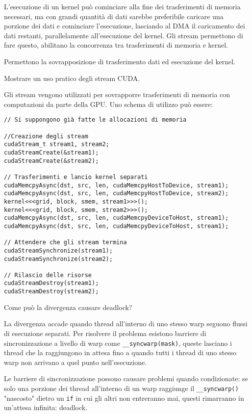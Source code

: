 \begin{questions}
\begin{solution}
        L'esecuzione di un kernel può cominciare alla fine dei trasferimenti di memoria necessari, ma con grandi quantità di dati sarebbe preferibile caricare una porzione dei dati e cominciare l'esecuzione, lasciando al DMA il caricamento dei dati restanti, parallelamente all'esecuzione del kernel. Gli stream permettono di fare questo, abilitano la concorrenza tra trasferimenti di memoria e kernel.
        
        Permettono la sovrapposizione di trasferimento dati ed esecuzione del kernel.
    \end{solution}
    
    \question Mostrare un uso pratico degli stream CUDA.
    
    \begin{solution}
        Gli stream vengono utilizzati per sovrapporre trasferimenti di memoria con computazioni da parte della GPU. Uno schema di utilizzo può essere: 
        \begin{verbatim}
// Si suppongono già fatte le allocazioni di memoria

//Creazione degli stream
cudaStream_t stream1, stream2;
cudaStreamCreate(&stream1);
cudaStreamCreate(&stream2);

// Trasferimenti e lancio kernel separati
cudaMemcpyAsync(dst, src, len, cudaMemcpyHostToDevice, stream1);
cudaMemcpyAsync(dst, src, len, cudaMemcpyHostToDevice, stream2);
kernel<<<grid, block, smem, stream1>>>();
kernel<<<grid, block, smem, stream2>>>();
cudaMemcpyAsync(dst, src, len, cudaMemcpyDeviceToHost, stream1);
cudaMemcpyAsync(dst, src, len, cudaMemcpyDeviceToHost, stream1);

// Attendere che gli stream termina
cudaStreamSynchronize(stream1);
cudaStreamSynchronize(stream2);

// Rilascio delle risorse
cudaStreamDestroy(stream1);
cudaStreamDestroy(stream2);
        \end{verbatim}
    \end{solution}
    
    \question Come può la divergenza causare deadlock?
    
    \begin{solution}
        La divergenza accade quando thread all'interno di uno stesso warp seguono flussi di esecuzione separati. Per risolvere il problema esistono barriere di sincronizzazione a livello di warp come \texttt{\_\_syncwarp(mask)}, queste lasciano i thread che la raggiungono in attesa fino a quando tutti i thread di uno stesso warp non arrivano a quel punto nell'esecuzione.
        
        Le barriere di sincronizzazione possono causare problemi quando condizionate: se solo una porzione dei thread all'interno di un warp raggiunge il \texttt{\_\_syncwarp()} "nascosto" dietro un \texttt{if} in cui gli altri non entreranno mai, questi rimarranno in un'attesa infinita: deadlock.
    \end{solution}
    
\end{questions}